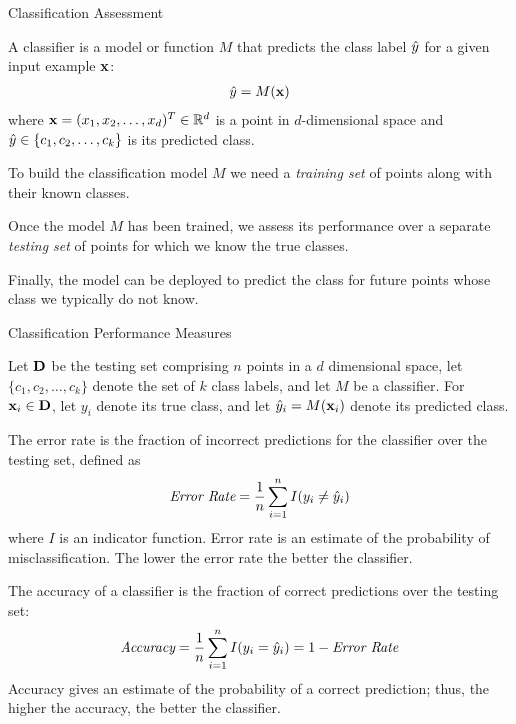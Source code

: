 
\date{Chapter 22: Classification Assessment}
\newcommand{\specificity}{\textit{specif\/{i}city}}

\begin{frame}
\titlepage
\end{frame}



\begin{frame}{Classif\/{i}cation Assessment}

A classif\/{i}er is a model or
function $M$ that predicts the class label $\hat{y}$ for a given input
example $\mathbf{x}$:
\begin{align*}
  \hat{y} = M(\mathbf{x})
\end{align*}
where $\mathbf{x} = (x_1, x_2, \ldots, x_d)^T \in {\mathord{\mathbb R}}^d$ is a point in
$d$-dimensional space and $\hat{y} \in \{c_1, c_2, \ldots, c_k\}$ is
its predicted class.

\medskip
To build the classif\/{i}cation model $M$ we need a {\em training set} of
points along with their known classes. 

\medskip
Once the model $M$ has been trained,
we assess its performance over a
separate {\em testing set} of points for which we know the
true classes. 

\medskip
F{i}nally, the model
can be deployed to predict the class for future points whose class we
typically do not know.
\end{frame}



\begin{frame}{Classif\/{i}cation Performance Measures}

Let $\mathbf{D}$ be the testing set comprising $n$ points in a $d$
dimensional space, let $\{c_1, c_2, \ldots, c_k\}$ denote the set
of $k$ class labels, and let $M$ be a classif\/{i}er. For $\mathbf{x}_i \in
\mathbf{D}$, let $y_i$ denote its true class, and let $\hat{y}_i = M(\mathbf{x}_i)$
denote its predicted class.

The error rate is the fraction
of incorrect predictions for the classif\/{i}er over the testing set,
def\/{i}ned as
\begin{align*}
  \textit{Error\ Rate} = {1 \over n} \sum_{i=1}^n I(y_i \ne \hat{y}_i)
\end{align*}
where $I$ is an indicator function.
Error rate is an estimate of the probability of misclassif\/{i}cation.
The lower the error rate the better the classif\/{i}er.

The accuracy of a classif\/{i}er is
the fraction of correct predictions over the testing set:
\begin{align*}
  \textit{Accuracy} ={1\over n} \sum_{i=1}^n I(y_i = \hat{y}_i)  = 1 - \textit{Error\ Rate}
\end{align*}
Accuracy gives an estimate of the probability of a correct
prediction; thus, the higher the accuracy, the better the
classif\/{i}er.
\end{frame}




